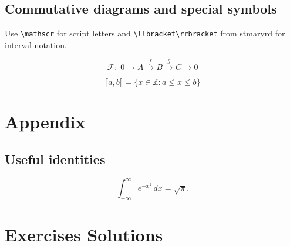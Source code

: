 \documentclass[12pt,oneside]{book}
\newcommand{\Z}{\mathbb{Z}}
\begin{document}
\section{Commutative diagrams and special symbols}
Use \verb|\mathscr| for script letters and \verb|\llbracket\rrbracket| from stmaryrd for interval notation.


\[
\mathscr{F}:\; 0 \to A \xrightarrow{f} B \xrightarrow{g} C \to 0
\]




\[
\llbracket a,b\rrbracket = \{x\in\Z: a\le x\le b\}
\]



\appendix
\chapter{Appendix}
\section{Useful identities}


\[
\int_{-\infty}^{\infty} e^{-x^2}\,dx = \sqrt{\pi}.
\]



\backmatter
\chapter{Exercises Solutions}
\end{document}
